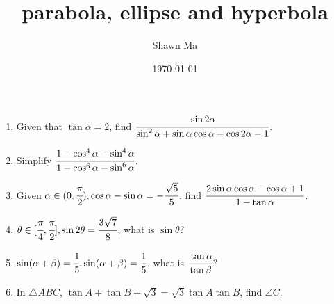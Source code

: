 \documentclass[letterpaper,12pt]{article}
\author{Shawn Ma}
\date{\today}
\title{parabola, ellipse and hyperbola}
\begin{document}
\setlength{\parindent}{0pt}

\begin{enumerate}
\item Given that $\tan\alpha=2$, find $\cfrac{\sin2\alpha}{\sin^2\alpha+\sin\alpha\cos\alpha-\cos2\alpha-1}$.
\vspace{3cm}
\item Simplify $\cfrac{1-\cos^4\alpha-\sin^4\alpha}{1-\cos^6\alpha-\sin^6\alpha}$.\vspace{3cm}
\item Given $\alpha\in(0,\cfrac{\pi}{2}), \cos\alpha-\sin\alpha=-\cfrac{\sqrt{5}}{5}$. 
find $\cfrac{2\sin\alpha\cos\alpha-\cos\alpha+1}{1-\tan\alpha}$.\vspace{3cm}
\item $\theta\in[\cfrac{\pi}{4},\cfrac{\pi}{2}], \sin2\theta=\cfrac{3\sqrt7}{8}$, what is $\sin\theta$?\vspace{3cm}
\item $\sin(\alpha+\beta)=\cfrac{1}{5}, \sin(\alpha+\beta)=\cfrac{1}{5}$, what is $\cfrac{\tan\alpha}{\tan\beta}$?\vspace{3cm}
\item In $\triangle ABC$, $\tan A+\tan B+\sqrt3=\sqrt3\tan A\tan B$, find $\angle C$.
\end{enumerate}
\end{document}
